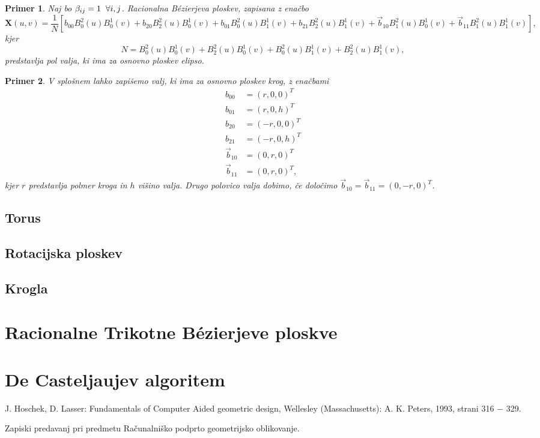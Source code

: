 \documentclass[a4paper,10pt]{article}
\newtheorem{primer}{Primer}
\begin{document}
\begin{primer}
    Naj bo $\beta_{ij} = 1 \hspace{0.2cm} \forall i, j$. Racionalna Bézierjeva ploskev, zapisana z enačbo $$
    \textbf{X} (u, v) = \frac{1}{N} \left[ b_{00} B_0^2(u) B_0^1(v) + b_{20} B_2^2(u) B_0^1(v) + 
    b_{01} B_0^2(u) B_1^1(v) + 
    b_{21} B_2^2(u) B_1^1(v) + 
    \vec{b}_{10} B_1^2(u) B_0^1(v) + 
    \vec{b}_{11} B_1^2(u) B_1^1(v) \right],
    $$ 
    kjer 
    $$
    N = B_0^2(u) B_0^1(v) + B_2^2(u) B_0^1(v) + 
    B_0^2(u) B_1^1(v) + B_2^2(u) B_1^1(v),
    $$ 
    predstavlja pol valja, ki ima za osnovno ploskev elipso.
\end{primer}

\begin{primer}
    V splošnem lahko zapišemo valj, ki ima za osnovno ploskev krog, z enačbami
    \begin{align*}
        b_{00} &= (r, 0, 0)^T \\
        b_{01} &= (r, 0, h)^T \\
        b_{20} &= (-r, 0, 0)^T \\
        b_{21} &= (-r, 0, h)^T \\
        \vec{b}_{10} &= (0, r, 0)^T \\
        \vec{b}_{11} &= (0, r, 0)^T,
    \end{align*} 
    kjer $r$ predstavlja polmer kroga in $h$ višino valja.
    Drugo polovico valja dobimo, če določimo $\vec{b}_{10} = \vec{b}_{11} = (0, -r, 0)^{T}$.
\end{primer}

\subsection{Torus}

\subsection{Rotacijska ploskev}

\subsection{Krogla}

\section{Racionalne Trikotne Bézierjeve ploskve}

\section{De Casteljaujev algoritem}

\begin{thebibliography}{9}
    J. Hoschek, D. Lasser: Fundamentals of Computer Aided geometric design,
    Wellesley (Massachusetts): A. K. Peters, 1993, strani 316 $-$ 329.

    Zapiski predavanj pri predmetu Računalniško podprto geometrijsko oblikovanje.
\end{thebibliography}
\end{document}
